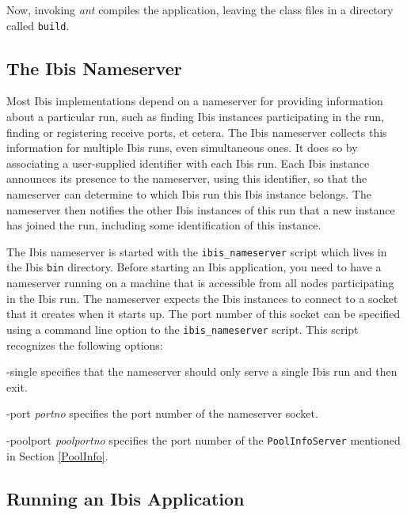 \documentclass[10pt]{article}
\newcommand{\mysubsection}[1]{\subsection{#1}\label{#1}}
\begin{document}
Now, invoking \emph{ant} compiles the application, leaving the class files
in a directory called \texttt{build}.

\mysubsection{The Ibis Nameserver}

Most Ibis implementations depend on a nameserver for providing
information about a particular run, such as finding Ibis instances
participating in the run, finding or registering receive ports, et cetera.
The Ibis nameserver collects this information for multiple Ibis
runs, even simultaneous ones. It does so by associating a user-supplied
identifier with each Ibis run. Each Ibis instance announces its
presence to the nameserver, using this identifier, so that the
nameserver can determine to which Ibis run this Ibis instance belongs.
The nameserver then notifies the other Ibis instances of this run that
a new instance has joined the run, including some identification of
this instance.

The Ibis nameserver is started with the \texttt{ibis\_nameserver} script which
lives in the Ibis \texttt{bin} directory. Before starting an Ibis application,
you need to have a nameserver running on a machine that is accessible
from all nodes participating in the Ibis run.
The nameserver expects the Ibis instances to connect to a
socket that it creates when it starts up.
The port number of this socket can be specified using a command line
option to the \texttt{ibis\_nameserver} script. This script recognizes
the following options:
\begin{description}
\item{-single}
specifies that the nameserver should only serve a single Ibis run
and then exit.
\item{-port \emph{portno}}
specifies the port number of the nameserver socket.
\item{-poolport \emph{poolportno}}
specifies the port number of the \texttt{PoolInfoServer} mentioned
in Section \ref{PoolInfo}.
\end{description}

\mysubsection{Running an Ibis Application}
\end{document}
